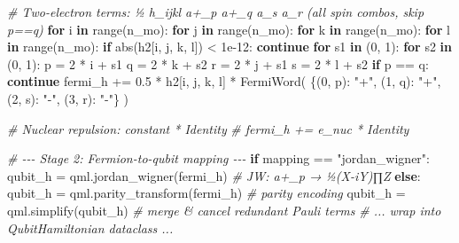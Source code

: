 \documentclass[
  11pt,
]{report}
\newenvironment{Shaded}{}{}
\newcommand{\BuiltInTok}[1]{\textcolor[rgb]{0.00,0.50,0.00}{#1}}
\newcommand{\CommentTok}[1]{\textcolor[rgb]{0.38,0.63,0.69}{\textit{#1}}}
\newcommand{\ControlFlowTok}[1]{\textcolor[rgb]{0.00,0.44,0.13}{\textbf{#1}}}
\newcommand{\DecValTok}[1]{\textcolor[rgb]{0.25,0.63,0.44}{#1}}
\newcommand{\FloatTok}[1]{\textcolor[rgb]{0.25,0.63,0.44}{#1}}
\newcommand{\KeywordTok}[1]{\textcolor[rgb]{0.00,0.44,0.13}{\textbf{#1}}}
\newcommand{\NormalTok}[1]{#1}
\newcommand{\OperatorTok}[1]{\textcolor[rgb]{0.40,0.40,0.40}{#1}}
\newcommand{\StringTok}[1]{\textcolor[rgb]{0.25,0.44,0.63}{#1}}
\begin{document}
\begin{Shaded}
\begin{Highlighting}[]
    \CommentTok{\# Two{-}electron terms: ½ h\_ijkl a+\_p a+\_q a\_s a\_r (all spin combos, skip p==q)}
    \ControlFlowTok{for}\NormalTok{ i }\KeywordTok{in} \BuiltInTok{range}\NormalTok{(n\_mo):}
        \ControlFlowTok{for}\NormalTok{ j }\KeywordTok{in} \BuiltInTok{range}\NormalTok{(n\_mo):}
            \ControlFlowTok{for}\NormalTok{ k }\KeywordTok{in} \BuiltInTok{range}\NormalTok{(n\_mo):}
                \ControlFlowTok{for}\NormalTok{ l }\KeywordTok{in} \BuiltInTok{range}\NormalTok{(n\_mo):}
                    \ControlFlowTok{if} \BuiltInTok{abs}\NormalTok{(h2[i, j, k, l]) }\OperatorTok{\textless{}} \FloatTok{1e{-}12}\NormalTok{:}
                        \ControlFlowTok{continue}
                    \ControlFlowTok{for}\NormalTok{ s1 }\KeywordTok{in}\NormalTok{ (}\DecValTok{0}\NormalTok{, }\DecValTok{1}\NormalTok{):}
                        \ControlFlowTok{for}\NormalTok{ s2 }\KeywordTok{in}\NormalTok{ (}\DecValTok{0}\NormalTok{, }\DecValTok{1}\NormalTok{):}
\NormalTok{                            p }\OperatorTok{=} \DecValTok{2} \OperatorTok{*}\NormalTok{ i }\OperatorTok{+}\NormalTok{ s1}
\NormalTok{                            q }\OperatorTok{=} \DecValTok{2} \OperatorTok{*}\NormalTok{ k }\OperatorTok{+}\NormalTok{ s2}
\NormalTok{                            r }\OperatorTok{=} \DecValTok{2} \OperatorTok{*}\NormalTok{ j }\OperatorTok{+}\NormalTok{ s1}
\NormalTok{                            s }\OperatorTok{=} \DecValTok{2} \OperatorTok{*}\NormalTok{ l }\OperatorTok{+}\NormalTok{ s2}
                            \ControlFlowTok{if}\NormalTok{ p }\OperatorTok{==}\NormalTok{ q:}
                                \ControlFlowTok{continue}
\NormalTok{                            fermi\_h }\OperatorTok{+=} \FloatTok{0.5} \OperatorTok{*}\NormalTok{ h2[i, j, k, l] }\OperatorTok{*}\NormalTok{ FermiWord(}
\NormalTok{                                \{(}\DecValTok{0}\NormalTok{, p): }\StringTok{"+"}\NormalTok{, (}\DecValTok{1}\NormalTok{, q): }\StringTok{"+"}\NormalTok{, (}\DecValTok{2}\NormalTok{, s): }\StringTok{"{-}"}\NormalTok{, (}\DecValTok{3}\NormalTok{, r): }\StringTok{"{-}"}\NormalTok{\}}
\NormalTok{                            )}

    \CommentTok{\# Nuclear repulsion: constant * Identity}
    \CommentTok{\# fermi\_h += e\_nuc * Identity}

    \CommentTok{\# {-}{-}{-} Stage 2: Fermion{-}to{-}qubit mapping {-}{-}{-}}
    \ControlFlowTok{if}\NormalTok{ mapping }\OperatorTok{==} \StringTok{"jordan\_wigner"}\NormalTok{:}
\NormalTok{        qubit\_h }\OperatorTok{=}\NormalTok{ qml.jordan\_wigner(fermi\_h)   }\CommentTok{\# JW: a+\_p → ½(X{-}iY)∏Z}
    \ControlFlowTok{else}\NormalTok{:}
\NormalTok{        qubit\_h }\OperatorTok{=}\NormalTok{ qml.parity\_transform(fermi\_h)  }\CommentTok{\# parity encoding}
\NormalTok{    qubit\_h }\OperatorTok{=}\NormalTok{ qml.simplify(qubit\_h)  }\CommentTok{\# merge \& cancel redundant Pauli terms}
    \CommentTok{\# ... wrap into QubitHamiltonian dataclass ...}


\end{Highlighting}
\end{Shaded}
\end{document}
